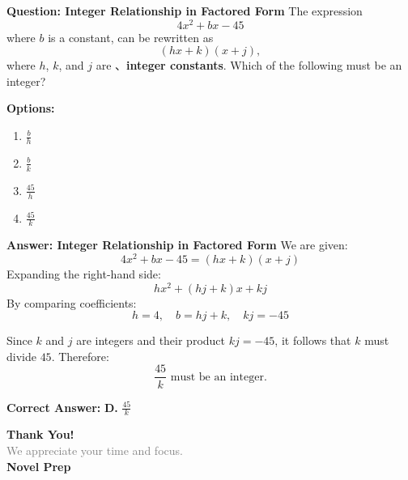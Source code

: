 \documentclass{beamer}
\begin{document}
\begin{frame}{\textbf{Question: Integer Relationship in Factored Form}}
The expression 
\[
4x^2 + bx - 45
\]
where $b$ is a constant, can be rewritten as 
\[
(hx + k)(x + j),
\]
where $h$, $k$, and $j$ are 、\textbf{integer constants}. Which of the following must be an integer?

\textbf{Options:}
\begin{enumerate}
    \item[A.] $\frac{b}{h}$
    \item[B.] $\frac{b}{k}$
    \item[C.] $\frac{45}{h}$
    \item[D.] $\frac{45}{k}$
\end{enumerate}
\end{frame}

\begin{frame}{\textbf{Answer: Integer Relationship in Factored Form}}
We are given:
\[
4x^2 + bx - 45 = (hx + k)(x + j)
\]
Expanding the right-hand side:
\[
hx^2 + (hj + k)x + kj
\]
By comparing coefficients:
\[
h = 4, \quad b = hj + k, \quad kj = -45
\]

Since $k$ and $j$ are integers and their product $kj = -45$, it follows that $k$ must divide $45$. Therefore:
\[
\frac{45}{k} \text{ must be an integer}.
\]

\textbf{Correct Answer:} \textbf{D. } $\frac{45}{k}$
\end{frame}














\begin{frame}{}

    \centering
    \vspace{5em}

    {\Huge \textbf{\textcolor{novelPurple}{Thank You!}}} \\[1em]
    {\large \textcolor{gray}{We appreciate your time and focus.}} \\[3em]

    {\LARGE \textbf{\textcolor{novelPurple}{\textsf{Novel Prep}}}}

    \vfill
\end{frame}
\end{document}
